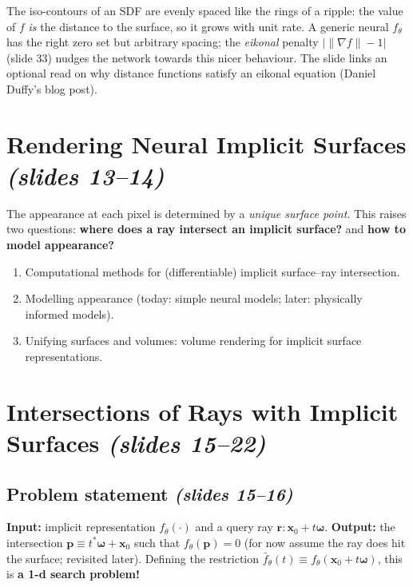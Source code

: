 \documentclass[11pt,a4paper]{article}
\newcommand{\bx}{{\bm{x}}}
\newcommand{\bp}{{\bm{p}}}
\newcommand{\bom}{{\bm{\omega}}}
\newcommand{\br}{{\bm{r}}}
\begin{document}
\begin{intuition}
The iso-contours of an SDF are evenly spaced like the rings of a ripple: the value of $f$ \emph{is} the distance to
the surface, so it grows with unit rate. A generic neural $f_\theta$ has the right zero set but arbitrary spacing; the
\emph{eikonal} penalty $\bigl|\|\nabla f\|-1\bigr|$ (slide 33) nudges the network towards this nicer behaviour.
The slide links an optional read on why distance functions satisfy an eikonal equation (Daniel Duffy's blog post).
\end{intuition}

\section{Rendering Neural Implicit Surfaces \emph{(slides 13--14)}}
The appearance at each pixel is determined by a \emph{unique surface point}. This raises two questions:
\textbf{where does a ray intersect an implicit surface?} and \textbf{how to model appearance?}

\begin{tcolorbox}[colback=white,colframe=black!60,title=Today's goals (slide 14)]
\begin{enumerate}[nosep,leftmargin=1.2em]
\item Computational methods for (differentiable) implicit surface--ray intersection.
\item Modelling appearance (today: simple neural models; later: physically informed models).
\item Unifying surfaces and volumes: volume rendering for implicit surface representations.
\end{enumerate}
\end{tcolorbox}

\section{Intersections of Rays with Implicit Surfaces \emph{(slides 15--22)}}
\subsection{Problem statement \emph{(slides 15--16)}}
\textbf{Input:} implicit representation $f_\theta(\cdot)$ and a query ray $\br:\bx_0+t\bom$.
\textbf{Output:} the intersection $\bp\equiv t^*\bom+\bx_0$ such that $f_\theta(\bp)=0$ (for now assume the ray
does hit the surface; revisited later).
Defining the restriction $\bar f_\theta(t)\equiv f_\theta(\bx_0+t\bom)$, this is \textbf{a 1-d search problem!}
\end{document}

